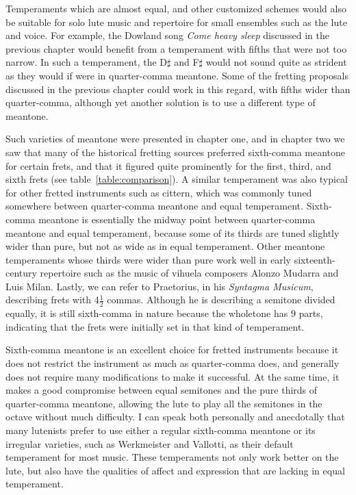 Temperaments which are almost equal, and other customized schemes would also
be suitable for solo lute music and repertoire for small ensembles such as
the lute and voice. For example, the Dowland song \textit{Come heavy sleep} discussed in
the previous chapter would benefit from a temperament with fifths that were not too
narrow.  In such a temperament,  the D$\sharp$ and F$\sharp$ would not sound quite
as strident as they would if were in quarter-comma meantone. Some of the
fretting proposals discussed in the previous chapter could work in this regard,
with fifths wider than quarter-comma, although yet another solution is to use a
different type of meantone.

Such varieties of meantone were presented in chapter one, and in chapter two we saw that many of the
historical fretting sources preferred sixth-comma meantone for certain frets, and that it figured
quite prominently for the first, third, and sixth frets (see table~\ref{table:comparison}). A
similar temperament was also typical for other fretted instruments such as cittern, which was
commonly tuned somewhere between quarter-comma meantone and equal temperament. \autocite[12]{PF:1}
Sixth-comma meantone is essentially the midway point between quarter-comma meantone and equal
temperament, because some of its thirds are tuned slightly wider than pure, but not as wide as in
equal temperament. Other meantone temperaments whose thirds were wider than pure work well in early
sixteenth-century repertoire such as the music of vihuela composers Alonzo Mudarra and Luis
Milan.\autocite[56]{WH:1} Lastly, we can refer to Praetorius, in his \textit{Syntagma Musicum},
describing frets with 4$ \frac{1}{2} $ commas.\autocite[68]{MP:1} Although he is describing a
semitone divided equally, it is still sixth-comma in nature because the wholetone has 9 parts,
indicating that the frets were initially set in that kind of temperament.

Sixth-comma meantone is an excellent choice for fretted instruments because it does not restrict the
instrument as much as quarter-comma does, and generally does not require many modifications to make
it successful. At the same time, it makes a good compromise between equal semitones and the pure
thirds of quarter-comma meantone, allowing the lute to play all the semitones in the octave without
much difficulty. I can speak both personally and anecdotally that many lutenists prefer to use
either a regular sixth-comma meantone or its irregular varieties, such as Werkmeister and
Vallotti, as their default temperament for most music. These temperaments not only work better on
the lute, but also have the qualities of affect and expression that are lacking in equal
temperament.


